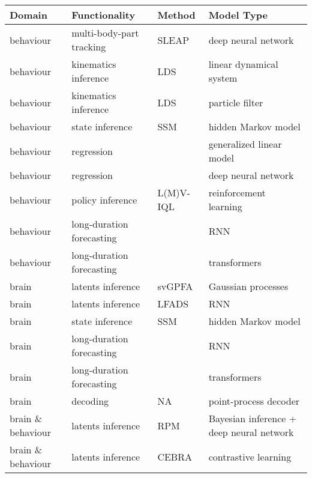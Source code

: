 \begin{table}
    \caption{Data analysis methods to disseminate}
    \label{table:methodsToDisseminate}
    \begin{longtable}{|p{1.9cm}|p{3cm}|p{2.5cm}|p{4.5cm}|}
        \hline
        \textbf{Domain} & \textbf{Functionality} & \textbf{Method} & \textbf{Model Type} \\
        \hline\hline
        behaviour & multi-body-part tracking & SLEAP & deep neural network \\
        \hline
        behaviour & kinematics inference & LDS & linear dynamical system \\
        \hline
        behaviour & kinematics inference & LDS & particle filter \\
        \hline
        behaviour & state inference & SSM & hidden Markov model \\
        \hline
        behaviour & regression &  & generalized linear model \\
        \hline
        behaviour & regression &  & deep neural network \\
        \hline
        behaviour & policy inference & L(M)V-IQL & reinforcement learning \\
        \hline
        behaviour & long-duration forecasting &  & RNN \\
        \hline
        behaviour & long-duration forecasting &  & transformers \\
        \hline\hline
        brain & latents inference & svGPFA & Gaussian processes \\
        \hline
        brain & latents inference & LFADS & RNN \\
        \hline
        brain & state inference & SSM & hidden Markov model \\
        \hline
        brain & long-duration forecasting &  & RNN \\
        \hline
        brain & long-duration forecasting &  & transformers \\
        \hline
        brain & decoding & NA & point-process decoder \\
        \hline\hline
        brain \& behaviour & latents inference & RPM & Bayesian inference + deep neural network \\
        \hline
        brain \& behaviour & latents inference & CEBRA & contrastive learning \\
        \hline
    \end{longtable}
\end{table}

